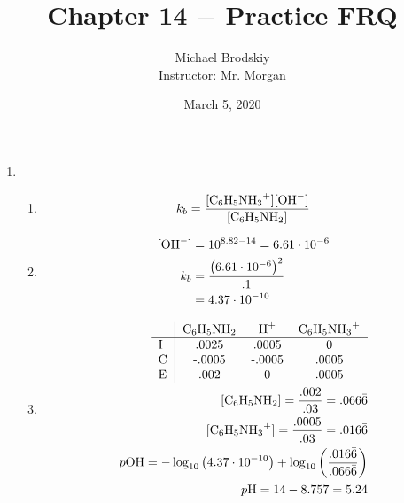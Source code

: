 \documentclass[12pt]{article}
\title{Chapter 14 $-$ Practice FRQ}
\date{March 5, 2020}
\author{Michael Brodskiy\\ \small Instructor: Mr. Morgan}
\begin{document}
\maketitle

\begin{enumerate}

  \item 

    \begin{enumerate}

      \item 

        \begin{equation}
          k_b=\frac{[\ce{C6H5NH3+}][\ce{OH-}]}{[\ce{C6H5NH2}]}
          \label{1}
        \end{equation}

      \item 

        \begin{equation}
          \begin{split}
            [\ce{OH-}]&=10^{8.82-14}=6.61\cdot10^{-6}\\
            k_b&=\frac{\left(6.61\cdot10^{-6}\right)^2}{.1}\\
            &=4.37\cdot10^{-10}
          \end{split}
          \label{2}
        \end{equation}

      \item {}

        \begin{equation}
          \begin{split}
            \begin{tabular}{l | c c c}
              & \ce{C6H5NH2} & \ce{H+} & \ce{C6H5NH3+}\\
              \hline
              \text{I} & .0025 & .0005 & 0\\
              \text{C} & -.0005 & -.0005 & .0005\\
              \text{E} & .002 & 0 & .0005\\
            \end{tabular}\\
            [\ce{C6H5NH2}]=\frac{.002}{.03}=.066\bar{6}\\
            [\ce{C6H5NH3+}]=\frac{.0005}{.03}=.016\bar{6}\\
            p\ce{OH}=-\log_{10}\left( 4.37\cdot10^{-10}  \right)+\log_{10}\left( \frac{.016\bar{6}}{.066\bar{6}} \right)\\
            p\ce{H}=14-8.757=5.24
          \end{split}
          \label{3}
        \end{equation}


\end{enumerate}
\end{enumerate}
\end{document}
